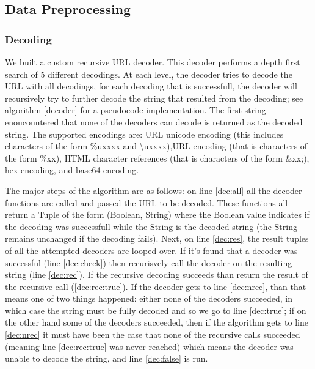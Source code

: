 \subsection{Data Preprocessing}
\subsubsection{Decoding}
We built a custom recursive URL decoder. This decoder performs a depth first search of 5 different decodings. At each level, the decoder tries to decode the URL with all decodings, for each decoding that is successfull, the decoder will recursively try to further decode the string that resulted from the decoding; see algorithm \ref{decoder} for a pseudocode implementation. The first string enoucountered that none of the decoders can decode is returned as the decoded string. The supported encodings are: URL unicode encoding (this includes characters of the form \%uxxxx and \textbackslash uxxxx),URL encoding (that is characters of the form \%xx), HTML character references (that is characters of the form \&xx;), hex encoding, and base64 encoding. 

The major steps of the algorithm are as follows: on line \ref{dec:all} all the decoder functions are called and passed the URL to be decoded. These functions all return a Tuple of the form (Boolean, String) where the Boolean value indicates if the decoding was successfull while the String is the decoded string (the String remains unchanged if the decoding fails). Next, on line \ref{dec:res}, the result tuples of all the attempted decoders are looped over. If it's found that a decoder was successful (line \ref{dec:check}) then recurisvely call the decoder on the resulting string (line \ref{dec:rec}). If the recursive decoding succeeds than return the result of the recursive call (\ref{dec:rec:true}). If the decoder gets to line \ref{dec:nrec}, than that means one of two things happened: either none of the decoders succeeded, in which case the string must be fully decoded and so we go to line \ref{dec:true}; if on the other hand some of the decoders succeeded, then if the algorithm gets to line \ref{dec:nrec} it must have been the case that none of the recursive calls succeeded (meaning line \ref{dec:rec:true} was never reached) which means the decoder was unable to decode the string, and line \ref{dec:false} is run. 

